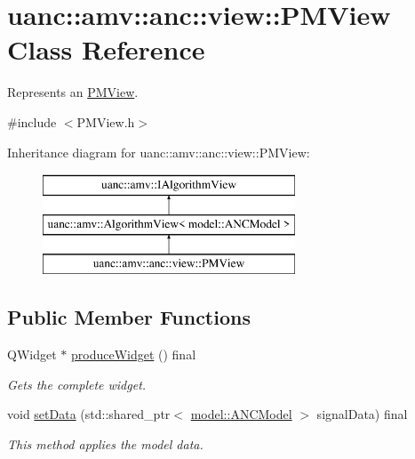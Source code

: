 \hypertarget{classuanc_1_1amv_1_1anc_1_1view_1_1_p_m_view}{}\section{uanc\+:\+:amv\+:\+:anc\+:\+:view\+:\+:P\+M\+View Class Reference}
\label{classuanc_1_1amv_1_1anc_1_1view_1_1_p_m_view}


Represents an \hyperlink{classuanc_1_1amv_1_1anc_1_1view_1_1_p_m_view}{P\+M\+View}.  




{\ttfamily \#include $<$P\+M\+View.\+h$>$}

Inheritance diagram for uanc\+:\+:amv\+:\+:anc\+:\+:view\+:\+:P\+M\+View\+:\begin{figure}[H]
\begin{center}
\leavevmode
\includegraphics[height=3.000000cm]{classuanc_1_1amv_1_1anc_1_1view_1_1_p_m_view}
\end{center}
\end{figure}
\subsection*{Public Member Functions}
\begin{DoxyCompactItemize}
\item 
Q\+Widget $\ast$ \hyperlink{classuanc_1_1amv_1_1anc_1_1view_1_1_p_m_view_a4f4d6f52427201d7dcd671c7932824ad}{produce\+Widget} () final
\begin{DoxyCompactList}\small\item\em Gets the complete widget. \end{DoxyCompactList}\item 
void \hyperlink{classuanc_1_1amv_1_1anc_1_1view_1_1_p_m_view_a6d87a1d7753d1bc76ac7fba5fa03e1d5}{set\+Data} (std\+::shared\+\_\+ptr$<$ \hyperlink{classuanc_1_1amv_1_1anc_1_1model_1_1_a_n_c_model}{model\+::\+A\+N\+C\+Model} $>$ signal\+Data) final
\begin{DoxyCompactList}\small\item\em This method applies the model data. \end{DoxyCompactList}\end{DoxyCompactItemize}


